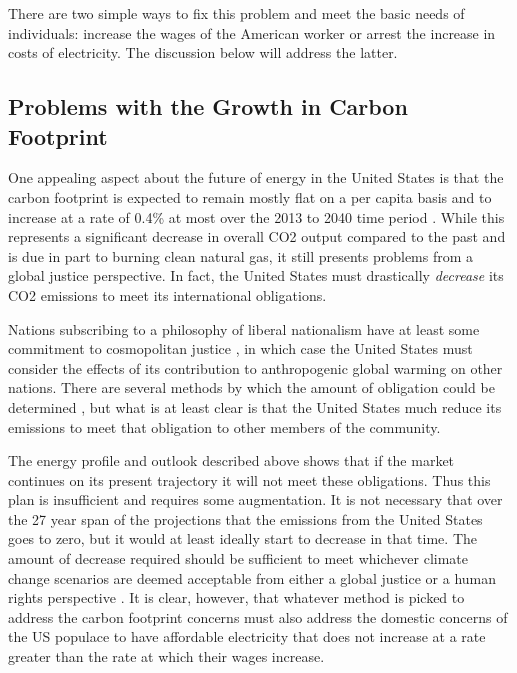There are two simple ways to fix this problem and meet the basic needs of individuals: increase the wages of the American worker or arrest the increase in costs of electricity. The discussion below will address the latter.

\subsection{Problems with the Growth in Carbon Footprint}

One appealing aspect about the future of energy in the United States is that the carbon footprint is expected to remain mostly flat on a per capita basis and to increase at a rate of 0.4\% at most over the 2013 to 2040 time period \cite{eiaAEO2015}. While this represents a significant decrease in overall CO2 output compared to the past and is due in part to burning clean natural gas, it still presents problems from a global justice perspective. In fact, the United States must drastically \textit{decrease} its CO2 emissions to meet its international obligations.

Nations subscribing to a philosophy of liberal nationalism have at least some commitment to cosmopolitan justice \cite{tan}, in which case the United States must consider the effects of its contribution to anthropogenic global warming on other nations. There are several methods by which the amount of obligation could be determined \cite{singer}, but what is at least clear is that the United States much reduce its emissions to meet that obligation to other members of the community.

The energy profile and outlook described above shows that if the market continues on its present trajectory it will not meet these obligations. Thus this plan is insufficient and requires some augmentation. It is not necessary that over the 27 year span of the projections that the emissions from the United States goes to zero, but it would at least ideally start to decrease in that time. The amount of decrease required should be sufficient to meet whichever climate change scenarios are deemed acceptable from either a global justice or a human rights perspective \cite{feldt}. It is clear, however, that whatever method is picked to address the carbon footprint concerns must also address the domestic concerns of the US populace to have affordable electricity that does not increase at a rate greater than the rate at which their wages increase. 

